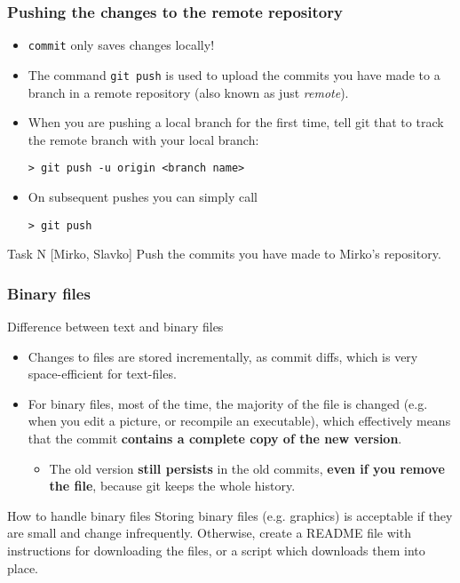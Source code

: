 
\begin{frame}[fragile]
	\frametitle{Pushing the changes to the remote repository}
	
	\begin{itemize}
	\item \texttt{commit} only saves changes \alert{locally}!
	\item The command \texttt{git push} is used to upload the commits you have made to a branch in a remote repository (also known as just \textit{remote}).
	\item When you are pushing a local branch for the first time, tell git that to track the remote branch with your local branch:
	\begin{verbatim}
> git push -u origin <branch name>
	\end{verbatim}
	\item On subsequent pushes you can simply call
	\begin{verbatim}
> git push
	\end{verbatim}
	\end{itemize}

	\begin{block}{Task N [Mirko, Slavko]}
	Push the commits you have made to Mirko's repository.
	\end{block}

\end{frame}


\begin{frame}
	\frametitle{Binary files}
	
	\begin{block}{Difference between text and binary files}
	\begin{itemize}
	\item Changes to files are stored incrementally, as commit diffs, which is very space-efficient for text-files.
    \item For binary files, most of the time, the majority of the file is changed (e.g. when you edit a picture, or recompile an executable), which effectively means that the commit \textbf{contains a complete copy of the new version}.
    \begin{itemize}
    \item The old version \textbf{still persists} in the old commits, \textbf{even if you remove the file}, because git keeps the whole history.
    \end{itemize}
    \end{itemize}
	\end{block}
	
	\begin{block}{How to handle binary files}
	Storing binary files (e.g. graphics) is acceptable if they are small and change infrequently. Otherwise, create a README file with instructions for downloading the files, or a script which downloads them into place.
	\end{block}
\end{frame}

